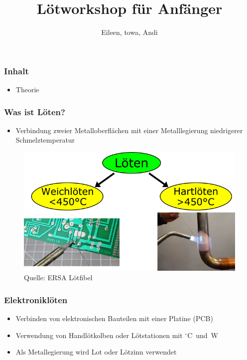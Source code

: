 \documentclass[10pt]{beamer}
\title[soldering-workshop] %
{Lötworkshop für Anfänger}
\author{Eileen, towa, Andi}
\begin{document}
    \maketitle
    
    \begin{frame}
    \frametitle{Inhalt}
    \begin{itemize}
    	\item{Theorie}
    \end{itemize}
	\end{frame}
    
    \begin{frame}
    \frametitle{Was ist Löten?}
    \begin{itemize}
    	\item{Verbindung zweier Metalloberflächen mit einer Metalllegierung niedrigerer Schmelztemperatur}
    \end{itemize}
	\begin{figure}[hbtp]
		\centering
		\includegraphics[width=\linewidth*2/3]{images/weich_hartloeten.png}
		\caption{Quelle: ERSA Lötfibel}
	\end{figure}
	\end{frame}

	\begin{frame}
	\frametitle{Elektroniklöten}
	\begin{itemize}
		\item{Verbinden von elektronischen Bauteilen mit einer Platine (PCB)}
		\item{Verwendung von Handlötkolben oder Lötstationen mit \unit[300-400]{$^\circ$C} und \unit[30-100]{W}}
		\item{Als Metallegierung wird Lot oder Lötzinn verwendet}
	\end{itemize}
	\end{frame}
\end{document}
